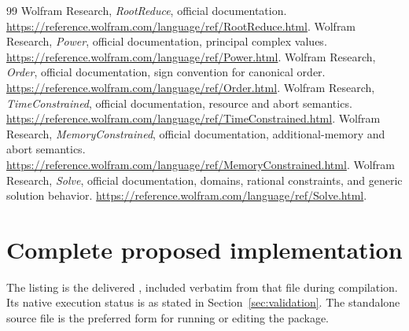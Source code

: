 \documentclass[11pt,letterpaper]{article}
\numberwithin{equation}{section}
\theoremstyle{definition}\newtheorem{definition}[theorem]{Definition}
\theoremstyle{remark}\newtheorem{remark}[theorem]{Remark}
\newcommand{\code}[1]{\texttt{\detokenize{#1}}}
\begin{document}
\begin{thebibliography}{99}
 Wolfram Research, \emph{RootReduce}, official documentation. \url{https://reference.wolfram.com/language/ref/RootReduce.html}.
 Wolfram Research, \emph{Power}, official documentation, principal complex values. \url{https://reference.wolfram.com/language/ref/Power.html}.
 Wolfram Research, \emph{Order}, official documentation, sign convention for canonical order. \url{https://reference.wolfram.com/language/ref/Order.html}.
 Wolfram Research, \emph{TimeConstrained}, official documentation, resource and abort semantics. \url{https://reference.wolfram.com/language/ref/TimeConstrained.html}.
 Wolfram Research, \emph{MemoryConstrained}, official documentation, additional-memory and abort semantics. \url{https://reference.wolfram.com/language/ref/MemoryConstrained.html}.
 Wolfram Research, \emph{Solve}, official documentation, domains, rational constraints, and generic solution behavior. \url{https://reference.wolfram.com/language/ref/Solve.html}.
\end{thebibliography}
\endgroup

\clearpage
\section{Complete proposed implementation}
\label{app:code}
The listing is the delivered \code{code/StradFixed3.wl}, included verbatim from that file during compilation. Its native execution status is as stated in Section~\ref{sec:validation}. The standalone source file is the preferred form for running or editing the package.

\end{document}
